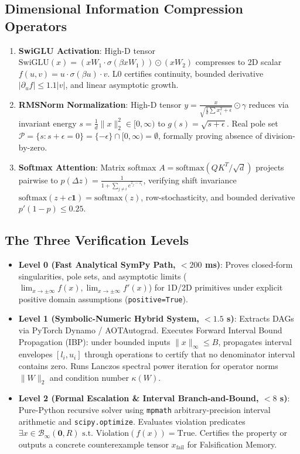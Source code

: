 \documentclass[11pt,a4paper]{article}
\begin{document}
\subsection{Dimensional Information Compression Operators}
\begin{enumerate}[noitemsep]
    \item \textbf{SwiGLU Activation}: High-D tensor $\text{SwiGLU}(x) = (x W_1 \cdot \sigma(\beta x W_1)) \odot (x W_2)$ compresses to 2D scalar $f(u, v) = u \cdot \sigma(\beta u) \cdot v$. L0 certifies continuity, bounded derivative $|\partial_u f| \le 1.1 |v|$, and linear asymptotic growth.
    \item \textbf{RMSNorm Normalization}: High-D tensor $y = \frac{x}{\sqrt{\frac{1}{d}\sum x_i^2 + \epsilon}} \odot \gamma$ reduces via invariant energy $s = \frac{1}{d}\|x\|_2^2 \in [0, \infty)$ to $g(s) = \sqrt{s + \epsilon}$. Real pole set $\mathcal{P} = \{s : s + \epsilon = 0\} = \{-\epsilon\} \cap [0, \infty) = \emptyset$, formally proving absence of division-by-zero.
    \item \textbf{Softmax Attention}: Matrix softmax $A = \text{softmax}(QK^T / \sqrt{d})$ projects pairwise to $p(\Delta z) = \frac{1}{1 + \sum_{j \neq i} e^{z_j - z_i}}$, verifying shift invariance $\text{softmax}(z + c\mathbf{1}) = \text{softmax}(z)$, row-stochasticity, and bounded derivative $p'(1-p) \le 0.25$.
\end{enumerate}

\subsection{The Three Verification Levels}
\begin{itemize}[noitemsep]
    \item \textbf{Level 0 (Fast Analytical SymPy Path, $<200$ ms)}: Proves closed-form singularities, pole sets, and asymptotic limits ($\lim_{x \to \pm\infty} f(x), \lim_{x \to \pm\infty} f'(x)$) for 1D/2D primitives under explicit positive domain assumptions (\texttt{positive=True}).
    \item \textbf{Level 1 (Symbolic-Numeric Hybrid System, $<1.5$ s)}: Extracts DAGs via PyTorch Dynamo / AOTAutograd. Executes Forward Interval Bound Propagation (IBP): under bounded inputs $\|x\|_\infty \le B$, propagates interval envelopes $[l_i, u_i]$ through operations to certify that no denominator interval contains zero. Runs Lanczos spectral power iteration for operator norms $\|W\|_2$ and condition number $\kappa(W)$.
    \item \textbf{Level 2 (Formal Escalation \& Interval Branch-and-Bound, $<8$ s)}: Pure-Python recursive solver using \texttt{mpmath} arbitrary-precision interval arithmetic and \texttt{scipy.optimize}. Evaluates violation predicates $\exists x \in \mathcal{B}_\infty(\mathbf{0}, R) \text{ s.t. } \text{Violation}(f(x)) = \text{True}$. Certifies the property or outputs a concrete counterexample tensor $x_{\text{fail}}$ for Falsification Memory.
\end{itemize}
\end{document}
